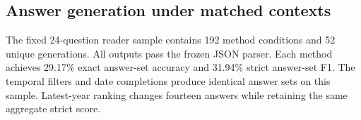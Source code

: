 \subsection{Answer generation under matched contexts}
The fixed 24-question reader sample contains 192 method conditions and 52 unique generations.
All outputs pass the frozen JSON parser.
Each method achieves 29.17\% exact answer-set accuracy and 31.94\% strict answer-set F1.
The temporal filters and date completions produce identical answer sets on this sample.
Latest-year ranking changes fourteen answers while retaining the same aggregate strict score.

